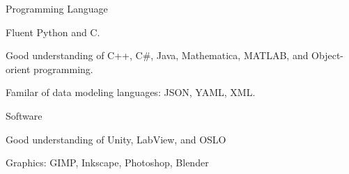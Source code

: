 \begin{cventries}
  \cventry
    {Programming Language}
    {}
    {}
    {}
    {
      \begin{cvitems}
        \item {Fluent Python and C.}
        \item {Good understanding of C++, C\#, Java, Mathematica, MATLAB, and Object-orient programming.}
        \item {Familar of data modeling languages: JSON, YAML, XML.}
      \end{cvitems}
      }
     \cventry
    {Software}
    {}
    {}
    {}
    {
      \begin{cvitems}
        \item {Good understanding of Unity, LabView, and OSLO}
        \item {Graphics: GIMP, Inkscape, Photoshop, Blender}
      \end{cvitems}
    }
\end{cventries}
